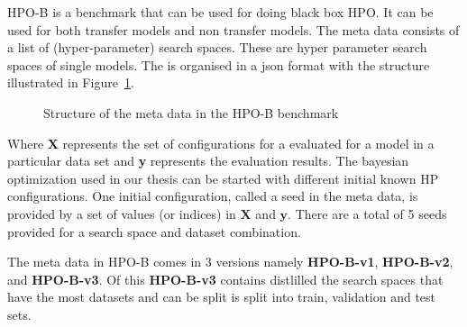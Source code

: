 \documentclass[11pt]{report}
\begin{document}
HPO-B is a benchmark that can be used for doing black box HPO.
It can be used for both transfer models and non transfer models.
The meta data consists of a list of (hyper-parameter) search spaces.
These are hyper parameter search spaces of single models.
The is organised in a json format with the structure illustrated in Figure~\ref{fig:metadataorganization}.

\begin{figure}[htb]
\centering
{}
\caption{Structure of the meta data in the HPO-B benchmark}
\label{fig:metadataorganization}
\end{figure}
Where \textbf{X} represents the set of configurations for a evaluated for a model in a particular data set and
\textbf{y} represents the evaluation results.
The bayesian optimization used in our thesis can be started with different initial known HP configurations.
One initial configuration, called a seed in the meta data, is provided by a set of values (or indices) in $\textbf{X}$ and $\textbf{y}$.
There are a total of 5 seeds provided for a search space and dataset combination.

The meta data in HPO-B comes in 3 versions namely \textbf{HPO-B-v1},  \textbf{HPO-B-v2}, and \textbf{HPO-B-v3}.
Of this \textbf{HPO-B-v3} contains distlilled the search spaces that have the most datasets and can be split is split into train,  validation and test sets. 
\end{document}
